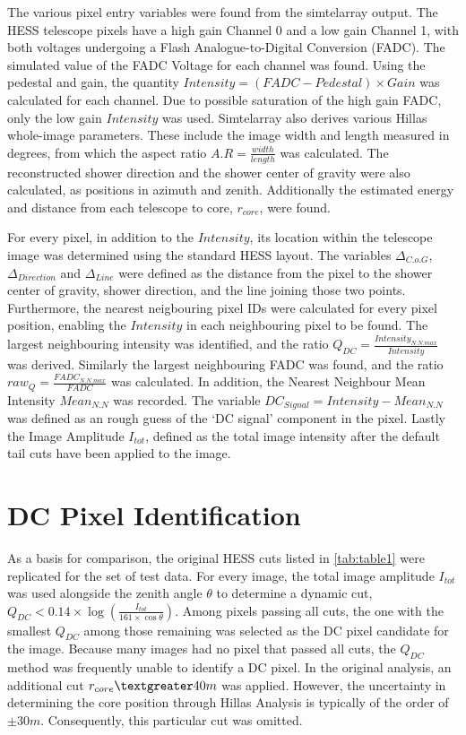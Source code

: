 \documentclass[]{article}
\begin{document}
The various pixel entry variables were found from the sim\textunderscore telarray output. The HESS telescope pixels have a high gain Channel 0 and a low gain Channel 1, with both voltages undergoing a Flash Analogue-to-Digital Conversion (FADC). The simulated value of the FADC Voltage for each channel was found. Using the pedestal and gain, the quantity $Intensity = (FADC - Pedestal)\times Gain $ was calculated for each channel. Due to possible saturation of the high gain FADC, only the low gain $Intensity$ was used. Sim\textunderscore telarray also derives various Hillas whole-image parameters. These include the image width and length measured in degrees, from which the aspect ratio $A.R = \frac{width}{length}$ was calculated. The reconstructed shower direction and the shower center of gravity were also calculated, as positions in azimuth and zenith. Additionally the estimated energy and distance from each telescope to core, $r_{core}$,  were found.

For every pixel, in addition to the $Intensity$, its location within the telescope image was determined using the standard HESS layout. The variables $ \Delta_{C.o.G}$, $\Delta_{Direction}$ and $\Delta_{Line}$ were defined as the distance from the pixel to the shower center of gravity, shower direction, and the line joining those two points. Furthermore, the nearest neigbouring pixel IDs were calculated for every pixel position, enabling the $Intensity$ in each neighbouring pixel to be found. The largest neighbouring intensity was identified, and the ratio $Q_{DC} = \frac{Intensity_{N.N.max}}{Intensity}$ was derived. Similarly the largest neighbouring FADC was found, and the ratio $raw_{Q} = \frac{FADC_{N.N.max}}{FADC}$ was calculated. In addition, the Nearest Neighbour Mean Intensity $Mean_{N.N}$ was recorded. The variable $DC_{Signal} = Intensity-Mean_{N.N}$ was defined as an rough guess of the \textquoteleft DC signal' component in the pixel. Lastly the Image Amplitude $I_{tot}$, defined as the total image intensity after the default tail cuts have been applied to the image.

\section{DC Pixel Identification}  
As a basis for comparison, the original HESS cuts listed in \ref{tab:table1} were replicated for the set of test data.   For every image, the total image amplitude $I_{tot}$ was used alongside the zenith angle $\theta$ to determine a dynamic cut, $Q_{DC} < 0.14 \times \log(\frac{I_{tot}}{161 \times \cos \theta})$. Among pixels passing all cuts, the one with the smallest $Q_{DC}$ among those remaining was selected as the DC pixel candidate for the image. Because many images had no pixel that passed all cuts, the $Q_{DC}$ method was frequently unable to identify a DC pixel. In the original analysis, an additional cut $r_{core} \textgreater 40m$ was applied. However, the uncertainty in determining the core position through Hillas Analysis is typically of the order of $\pm 30m$. Consequently, this particular cut was omitted. 
\end{document}
